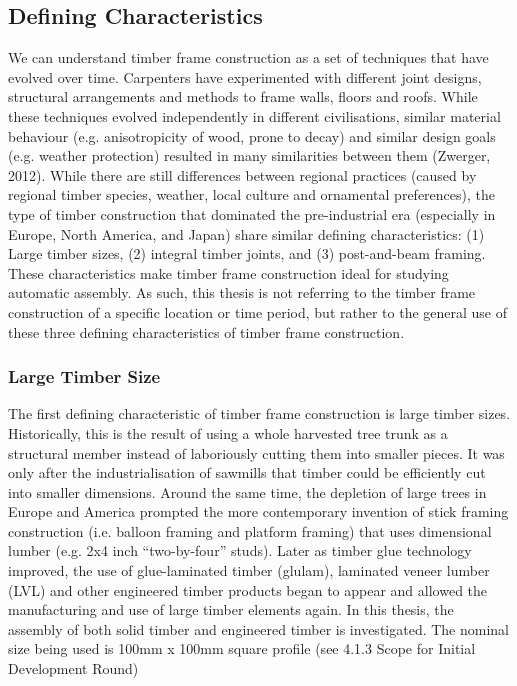 \subsection{Defining Characteristics}
We can understand timber frame construction as a set of techniques that have evolved over time. Carpenters have experimented with different joint designs, structural arrangements and methods to frame walls, floors and roofs. While these techniques evolved independently in different civilisations, similar material behaviour (e.g. anisotropicity of wood, prone to decay) and similar design goals (e.g. weather protection) resulted in many similarities between them (Zwerger, 2012). While there are still differences between regional practices (caused by regional timber species, weather, local culture and ornamental preferences), the type of timber construction that dominated the pre-industrial era (especially in Europe, North America, and Japan) share similar defining characteristics: (1) Large timber sizes, (2) integral timber joints, and (3) post-and-beam framing. 
These characteristics make timber frame construction ideal for studying automatic assembly. As such, this thesis is not referring to the timber frame construction of a specific location or time period, but rather to the general use of these three defining characteristics of timber frame construction.

\subsubsection{Large Timber Size}
The first defining characteristic of timber frame construction is large timber sizes. Historically, this is the result of using a whole harvested tree trunk as a structural member instead of laboriously cutting them into smaller pieces. It was only after the industrialisation of sawmills that timber could be efficiently cut into smaller dimensions. Around the same time, the depletion of large trees in Europe and America prompted the more contemporary invention of stick framing construction (i.e. balloon framing and platform framing) that uses dimensional lumber (e.g. 2x4 inch “two-by-four” studs). Later as timber glue technology improved, the use of glue-laminated timber (glulam), laminated veneer lumber (LVL) and other engineered timber products began to appear and allowed the manufacturing and use of large timber elements again. In this thesis, the assembly of both solid timber and engineered timber is investigated. The nominal size being used is 100mm x 100mm square profile (see 4.1.3 Scope for Initial Development Round)

